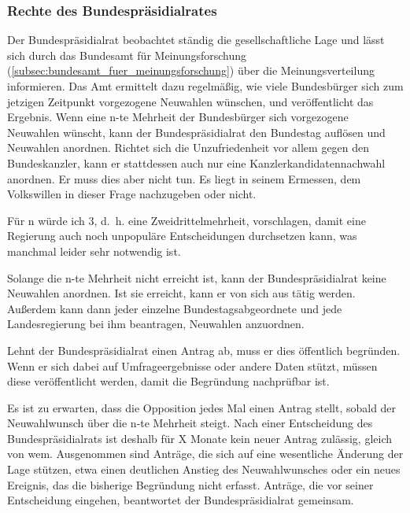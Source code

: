 \subsubsection{Rechte des Bundespräsidialrates} \label{subsubsec:rechte_des_bundespraesidialrats}

\label{subsubsubsec:vorgezogene_neuwahlen_auf_volkswunsch_hin}

Der Bundespräsidialrat beobachtet ständig die gesellschaftliche Lage und lässt sich durch das Bundesamt für Meinungsforschung (\cref{subsec:bundesamt_fuer_meinungsforschung}) über die Meinungsverteilung informieren.
Das Amt ermittelt dazu regelmäßig, wie viele Bundesbürger sich zum jetzigen Zeitpunkt vorgezogene Neuwahlen wünschen, und veröffentlicht das Ergebnis.
Wenn eine n-te Mehrheit der Bundesbürger sich vorgezogene Neuwahlen wünscht, kann der Bundespräsidialrat den Bundestag auflösen und Neuwahlen anordnen.
Richtet sich die Unzufriedenheit vor allem gegen den Bundeskanzler, kann er stattdessen auch nur eine Kanzlerkandidatennachwahl anordnen.
Er muss dies aber nicht tun.
Es liegt in seinem Ermessen, dem Volkswillen in dieser Frage nachzugeben oder nicht.

Für n würde ich 3, d.~h. eine Zweidrittelmehrheit, vorschlagen, damit eine Regierung auch noch unpopuläre Entscheidungen durchsetzen kann, was manchmal leider sehr notwendig ist.

Solange die n-te Mehrheit nicht erreicht ist, kann der Bundespräsidialrat keine Neuwahlen anordnen.
Ist sie erreicht, kann er von sich aus tätig werden.
Außerdem kann dann jeder einzelne Bundestagsabgeordnete und jede Landesregierung bei ihm beantragen, Neuwahlen anzuordnen.

Lehnt der Bundespräsidialrat einen Antrag ab, muss er dies öffentlich begründen.
Wenn er sich dabei auf Umfrageergebnisse oder andere Daten stützt, müssen diese veröffentlicht werden, damit die Begründung nachprüfbar ist.

Es ist zu erwarten, dass die Opposition jedes Mal einen Antrag stellt, sobald der Neuwahlwunsch über die n-te Mehrheit steigt.
Nach einer Entscheidung des Bundespräsidialrats ist deshalb für X Monate kein neuer Antrag zulässig, gleich von wem.
Ausgenommen sind Anträge, die sich auf eine wesentliche Änderung der Lage stützen, etwa einen deutlichen Anstieg des Neuwahlwunsches oder ein neues Ereignis, das die bisherige Begründung nicht erfasst.
Anträge, die vor seiner Entscheidung eingehen, beantwortet der Bundespräsidialrat gemeinsam.

